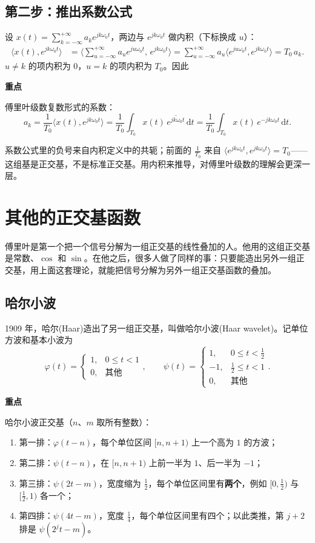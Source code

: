 \documentclass[UTF8,a4paper,11pt]{ctexart}
\newenvironment{remember}{\begin{rememberbox}\textbf{重点}\par\smallskip}{\end{rememberbox}}
\newcounter{ex}[section]
\begin{document}
\subsection{第二步：推出系数公式}
设 $x(t)=\sum_{k=-\infty}^{+\infty}a_ke^{jk\omega_0t}$，两边与 $e^{jk\omega_0t}$ 做内积（下标换成 $u$）：
\begin{align*}
\langle x(t),e^{jk\omega_0t}\rangle
&=\Big\langle\sum_{u=-\infty}^{+\infty}a_ue^{ju\omega_0t},\,e^{jk\omega_0t}\Big\rangle
=\sum_{u=-\infty}^{+\infty}a_u\big\langle e^{ju\omega_0t},e^{jk\omega_0t}\big\rangle
=T_0\,a_k .
\end{align*}
$u\ne k$ 的项内积为 $0$，$u=k$ 的项内积为 $T_0$。因此
\begin{remember}
傅里叶级数复数形式的系数：
\[
a_k=\frac1{T_0}\langle x(t),e^{jk\omega_0t}\rangle
=\frac1{T_0}\int_{T_0}x(t)\,\overline{e^{jk\omega_0t}}\,\mathrm{d}t
=\frac1{T_0}\int_{T_0}x(t)\,e^{-jk\omega_0t}\,\mathrm{d}t .
\]
\end{remember}
系数公式里的负号来自内积定义中的共轭；前面的 $\frac1{T_0}$ 来自 $\langle e^{jk\omega_0t},e^{jk\omega_0t}\rangle=T_0$——这组基是正交基，不是标准正交基。用内积来推导，对傅里叶级数的理解会更深一层。

\section{其他的正交基函数}\label{sec:other}
傅里叶是第一个把一个信号分解为一组正交基的线性叠加的人。他用的这组正交基是常数、$\cos$ 和 $\sin$。在他之后，很多人做了同样的事：只要能造出另外一组正交基，用上面这套理论，就能把信号分解为另外一组正交基函数的叠加。

\subsection{哈尔小波}\label{sub:haar}
1909 年，哈尔(Haar)造出了另一组正交基，叫做哈尔小波(Haar wavelet)。记单位方波和基本小波为
\[
\varphi(t)=\begin{cases}1,&0\le t<1\\0,&\text{其他}\end{cases},\qquad
\psi(t)=\begin{cases}1,&0\le t<\frac12\\-1,&\frac12\le t<1\\0,&\text{其他}\end{cases}.
\]
\begin{remember}
哈尔小波正交基（$n$、$m$ 取所有整数）：
\begin{enumerate}[nosep,label=\textcircled{\scriptsize\arabic*}]
\item 第一排：$\varphi(t-n)$，每个单位区间 $[n,n+1)$ 上一个高为 $1$ 的方波；
\item 第二排：$\psi(t-n)$，在 $[n,n+1)$ 上前一半为 $1$、后一半为 $-1$；
\item 第三排：$\psi(2t-m)$，宽度缩为 $\frac12$，每个单位区间里有\textbf{两个}，例如 $[0,\frac12)$ 与 $[\frac12,1)$ 各一个；
\item 第四排：$\psi(4t-m)$，宽度 $\frac14$，每个单位区间里有四个；以此类推，第 $j+2$ 排是 $\psi(2^jt-m)$。
\end{enumerate}
\end{remember}
\end{document}
